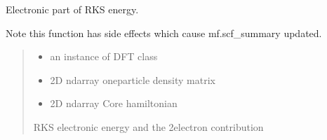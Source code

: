 \documentclass[letterpaper,10pt,english]{sphinxmanual}
\begin{document}
\begin{fulllineitems}

\begin{fulllineitems}
\label{\detokenize{fcdft.wbl:fcdft.wbl.rks.WBLMoleculeRKS.dump_flags}}
\pysigstartsignatures
\pysiglinewithargsret
{}
{}
{}
\pysigstopsignatures
\end{fulllineitems}


\begin{fulllineitems}
\label{\detokenize{fcdft.wbl:fcdft.wbl.rks.WBLMoleculeRKS.energy_elec}}
\pysigstartsignatures
\pysiglinewithargsret
{}
{\sphinxparamcomma {}\sphinxparamcomma {}}
{}
\pysigstopsignatures
\sphinxAtStartPar
Electronic part of RKS energy.

\sphinxAtStartPar
Note this function has side effects which cause mf.scf\_summary updated.
\begin{quote}\begin{description}
\begin{itemize}
\item {} 
\sphinxAtStartPar
{} \textendash{} an instance of DFT class

\item {} 
\sphinxAtStartPar
{} \textendash{} 2D ndarray
one\sphinxhyphen{}particle density matrix

\item {} 
\sphinxAtStartPar
{} \textendash{} 2D ndarray
Core hamiltonian

\end{itemize}

\sphinxAtStartPar
RKS electronic energy and the 2\sphinxhyphen{}electron contribution

\end{description}\end{quote}


\end{fulllineitems}
\end{fulllineitems}
\end{document}
